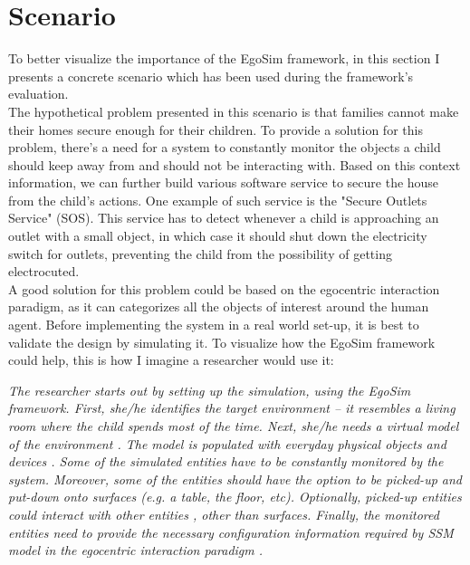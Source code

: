 \section{Scenario} %
\label{sec:scenario}
To better visualize the importance of the EgoSim framework, in this section I presents a concrete scenario which has been used during the framework's evaluation.\\

The hypothetical problem presented in this scenario is that families cannot make their homes secure enough for their children. To provide a solution for this problem, there's a need for a system to constantly monitor the objects a child should keep away from and should not be interacting with. Based on this context information, we can further build various software service to secure the house from the child's actions. One example of such service is the "Secure Outlets Service" (SOS). This service has to detect whenever a child is approaching an outlet with a small object, in which case it should shut down the electricity switch for outlets, preventing the child from the possibility of getting electrocuted.\\

A good solution for this problem could be based on the egocentric interaction paradigm, as it can categorizes all the objects of interest around the human agent. Before implementing the system in a real world set-up, it is best to validate the design by simulating it. To visualize how the EgoSim framework could help, this is how I imagine a researcher would use it:

\begin{flushright}{\slshape
The researcher starts out by setting up the simulation, using the EgoSim framework. First, she/he identifies the target environment -- it resembles a living room where the child spends most of the time. Next, she/he 
needs a virtual model of the environment . The model is populated  with everyday physical objects  and devices . Some of the simulated entities have to be constantly monitored  by the system. Moreover, some of the entities should have the option to be picked-up  and put-down  onto surfaces  (e.g. a table, the floor, etc). Optionally, picked-up entities could interact with other entities , other than surfaces. Finally, the monitored entities need to provide the necessary configuration information required by SSM model in the egocentric interaction paradigm .
} \\ \medskip
\end{flushright}

